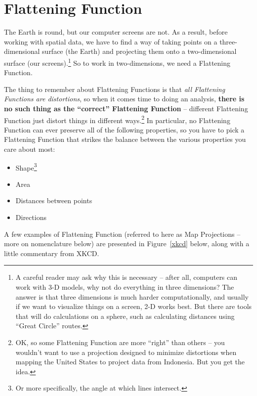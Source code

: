 \documentclass[11pt]{article}
\begin{document}
\section{Flattening Function}
The Earth is round, but our computer screens are not. As a result, before working with spatial data, we have to find a way of taking points on a three-dimensional surface (the Earth) and projecting them onto a two-dimensional surface (our screens).\footnote{A careful reader may ask why this is necessary -- after all, computers can work with 3-D models, why not do everything in three dimensions? The answer is that three dimensions is much harder computationally, and usually if we want to visualize things on a screen, 2-D works best. But there are tools that will do calculations on a sphere, such as calculating distances using ``Great Circle'' routes.} So to work in two-dimensions, we need a Flattening Function.

The thing to remember about Flattening Functions is that \emph{all Flattening Functions are distortions}, so when it comes time to doing an analysis, \textbf{there is no such thing as the ``correct'' Flattening Function} -- different Flattening Function just distort things in different ways.\footnote{OK, so some Flattening Function are more ``right'' than others -- you wouldn't want to use a projection designed to minimize distortions when mapping the United States to project data from Indonesia. But you get the idea.} In particular, no Flattening Function can ever preserve all of the following properties, so you have to pick a Flattening Function that strikes the balance between the various properties you care about most:
\begin{itemize}
	\item Shape\footnote{Or more specifically, the angle at which lines intersect.}
	\item Area
	\item Distances between points
	\item Directions
\end{itemize}

A few examples of Flattening Function (referred to here as Map Projections -- more on nomenclature below) are presented in Figure~\ref{xkcd} below, along with a little commentary from XKCD.
\end{document}
